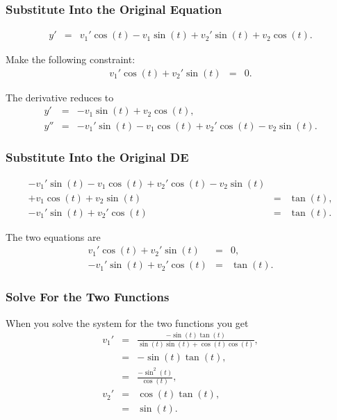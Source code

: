\begin{frame}
  \frametitle{Substitute Into the Original Equation}

  \begin{eqnarray*}
    y' & = & v_1' \cos(t) - v_1 \sin(t) + v_2' \sin(t) + v_2 \cos(t).
  \end{eqnarray*}

  Make the following constraint:
  \begin{eqnarray*}
    v_1' \cos(t) + v_2' \sin(t)  & = & 0.
  \end{eqnarray*}

  The derivative reduces to 
  \begin{eqnarray*}
    y' & = & - v_1 \sin(t) + v_2 \cos(t), \\
    y'' & = & - v_1' \sin(t) - v_1 \cos(t) + v_2' \cos(t) - v_2 \sin(t).
  \end{eqnarray*}


\end{frame}

\begin{frame}
  \frametitle{Substitute Into the Original DE}

  \begin{eqnarray*}
    - v_1' \sin(t) - v_1 \cos(t) + v_2' \cos(t) - v_2 \sin(t) & & \\
    + v_1 \cos(t) + v_2 \sin(t) & = & \tan(t), \\
    - v_1' \sin(t) + v_2' \cos(t) & = & \tan(t).
  \end{eqnarray*}

  The two equations are 
  \begin{eqnarray*}
    v_1' \cos(t) + v_2' \sin(t)  & = & 0, \\
    - v_1' \sin(t) + v_2' \cos(t) & = & \tan(t).
  \end{eqnarray*}

\end{frame}

\begin{frame}
  \frametitle{Solve For the Two Functions}

  When you solve the system for the two functions you get 
  \begin{eqnarray*}
    v_1' & = & \frac{-\sin(t)\tan(t)}{\sin(t)\sin(t)+\cos(t)\cos(t)}, \\
    & = & -\sin(t)\tan(t), \\
    & = & \frac{-\sin^2(t)}{\cos(t)}, \\
    v_2' & = & \cos(t)\tan(t), \\
    & = & \sin(t).
  \end{eqnarray*}

\end{frame}


